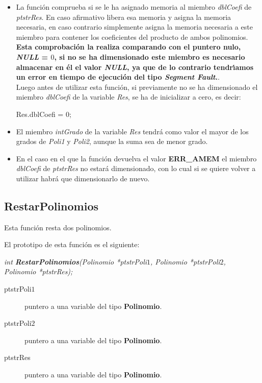 \begin{itemize}
\item La funci\'on comprueba si se le ha asignado memoria al miembro 
\emph{dblCoefi} de \emph{ptstrRes}. En caso afirmativo libera esa
memoria y asigna la memoria necesaria, en caso contrario simplemente asigna
la memoria necesaria a este miembro para contener los coeficientes del
producto de ambos polinomios.\\

\textbf{Esta comprobaci\'on la realiza comparando con el puntero nulo, 
\emph{NULL} = $0$, si no se ha dimensionado este miembro es necesario almacenar
en \'el el valor \emph{NULL}, ya que de lo contrario tendr\'{\i}amos un error
en tiempo de ejecuci\'on del tipo \emph{Segment Fault}.}.\\

Luego antes de utilizar esta funci\'on, si previamente no se ha dimensionado
el miembro \emph{dblCoefi} de la variable \emph{Res}, se ha de inicializar
a cero, es decir:

\begin{center}
Res.dblCoefi = 0;
\end{center}
\item El miembro \emph{intGrado} de la variable \emph{Res} tendr\'a como
valor el mayor de los grados de \emph{Poli1} y \emph{Poli2}, aunque la suma
sea de menor grado.
\item En el caso en el que la funci\'on devuelva el valor \textbf{ERR\_AMEM} el
miembro \emph{dblCoefi} de \emph{ptstrRes} no estar\'a dimensionado, con lo
cual si se quiere volver a utilizar habr\'a que dimensionarlo de nuevo.
\end{itemize}

\subsection{RestarPolinomios}

Esta funci\'on resta dos polinomios.\newline

El prototipo de esta funci\'on es el siguiente:

\begin{center}
\emph{int \textbf{RestarPolinomios}(Polinomio *ptstrPoli$1$,
Polinomio *ptstrPoli$2$, \\Polinomio *ptstrRes);}
\end{center}

\begin{description}
\item[ptstrPoli$1$] puntero a una variable del tipo \textbf{Polinomio}. 
\item[ptstrPoli$2$] puntero a una variable del tipo \textbf{Polinomio}. 
\item[ptstrRes] puntero a una variable del tipo \textbf{Polinomio}.
\end{description}

